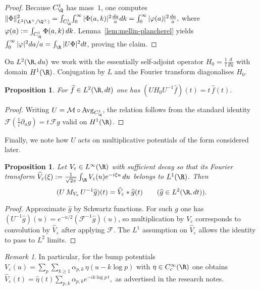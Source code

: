 ﻿\documentclass[12pt,a4paper]{article}
\newtheorem{proposition}[theorem]{Proposition}
\theoremstyle{definition}
\theoremstyle{remark}
\newtheorem{remark}[theorem]{Remark}
\begin{document}
\begin{proof}
Because $C_\Q^1$ has mass~$1$, one computes
\(
  \|\Phi\|_{L^2(\A^\times/\Q^\times)}^2
   = \int_{C_\Q^1}\!\int_0^\infty |\Phi(a,k)|^2\frac{da}{a}dk
   = \int_0^\infty |\varphi(a)|^2\frac{da}{a},
\)
where $\varphi(a):=\int_{C_\Q^1}\Phi(a,k)\,dk$.
Lemma~\ref{lem:mellin-plancherel} yields $\int_0^\infty |\varphi|^2da/a = \int_\R |U\Phi|^2 dt$, proving the claim.
\end{proof}

On $L^2(\R,du)$ we work with the essentially self-adjoint operator $H_0 = \frac{1}{i}\frac{d}{du}$ with domain $H^1(\R)$.  Conjugation by $L$ and the Fourier transform diagonalises $H_0$.

\begin{proposition}\label{prop:H0-conjugation}
For $\widehat f\in L^2(\R,dt)$ one has
\(
  (U H_0 U^{-1}\widehat f)(t) = t\,\widehat f(t).
\)
\end{proposition}

\begin{proof}
Writing $U = \mathcal M \circ \mathrm{Avg}_{C_\Q^1}$, the relation follows from the standard identity $\mathcal F(\tfrac{1}{i}\partial_u g) = t\,\mathcal F g$ valid on $H^1(\R)$.
\end{proof}

Finally, we note how $U$ acts on multiplicative potentials of the form considered later.

\begin{proposition}\label{prop:V-transform}
Let $V_\varepsilon\in L^\infty(\R)$ with sufficient decay so that its Fourier transform \(\widehat V_\varepsilon(\xi):=\frac{1}{\sqrt{2\pi}}\int_{\R}V_\varepsilon(u)e^{-i\xi u}\,du\) belongs to $L^1(\R)$.  Then
\[
  (U\,M_{V_\varepsilon}\,U^{-1}\widehat g)(t)
  = \widehat V_\varepsilon * \widehat g (t)
  \qquad (\widehat g\in L^2(\R,dt)).
\]
\end{proposition}

\begin{proof}
Approximate $\widehat g$ by Schwartz functions.  For such $g$ one has $(U^{-1}\widehat g)(u)=e^{-u/2}(\mathcal F^{-1}\widehat g)(u)$, so multiplication by $V_\varepsilon$ corresponds to convolution by $\widehat V_\varepsilon$ after applying $\mathcal F$.  The $L^1$ assumption on $\widehat V_\varepsilon$ allows the identity to pass to $L^2$ limits.
\end{proof}

\begin{remark}
In particular, for the bump potentials $V_\varepsilon(u)=\sum_{p}\sum_{k\ge1}\alpha_{p,k}\,\eta(u-k\log p)$ with $\eta\in C_c^\infty(\R)$ one obtains
\(
  \widehat V_\varepsilon(t) = \widehat\eta(t)\sum_{p,k}\alpha_{p,k} e^{-ik\log p\,t},
\)
as advertised in the research notes.
\end{remark}
\end{document}
